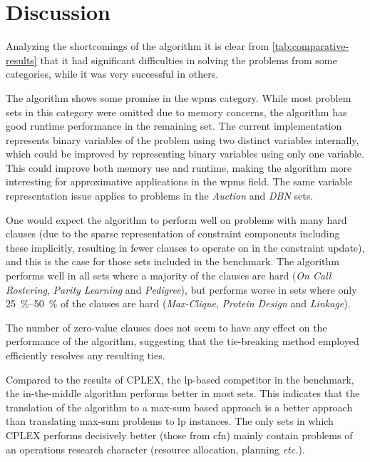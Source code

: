 \section{Discussion}
Analyzing the shortcomings of the algorithm it is clear from \cref{tab:comparative-results} that it had significant difficulties in solving the problems from some categories, while it was very successful in others.

The algorithm shows some promise in the \gls{wpms} category.
While most problem sets in this category were omitted due to memory concerns, the algorithm has good runtime performance in the remaining set.
The current implementation represents binary variables of the problem using two distinct variables internally, which could be improved by representing binary variables using only one variable.
This could improve both memory use and runtime, making the algorithm more interesting for approximative applications in the \gls{wpms} field.
The same variable representation issue applies to problems in the \emph{Auction} and \emph{DBN} sets.

One would expect the algorithm to perform well on problems with many hard clauses (due to the sparse representation of constraint components including these implicitly, resulting in fewer clauses to operate on in the constraint update), and this is the case for those sets included in the benchmark.
The algorithm performs well in all sets where a majority of the clauses are hard (\emph{On Call Rostering}, \emph{Parity Learning} and \emph{Pedigree}), but performs worse in sets where only \SIrange{25}{50}{\percent} of the clauses are hard (\emph{Max-Clique}, \emph{Protein Design} and \emph{Linkage}).

The number of zero-value clauses does not seem to have any effect on the performance of the algorithm, suggesting that the tie-breaking method employed efficiently resolves any resulting ties.

Compared to the results of CPLEX, the \gls{lp}-based competitor in the benchmark, the in-the-middle algorithm performs better in most sets.
This indicates that the translation of the algorithm to a max-sum based approach is a better approach than translating max-sum problems to \gls{lp} instances.
The only sets in which CPLEX performs decisively better (those from \gls{cfn}) mainly contain problems of an operations research character (resource allocation, planning \emph{etc.}).


